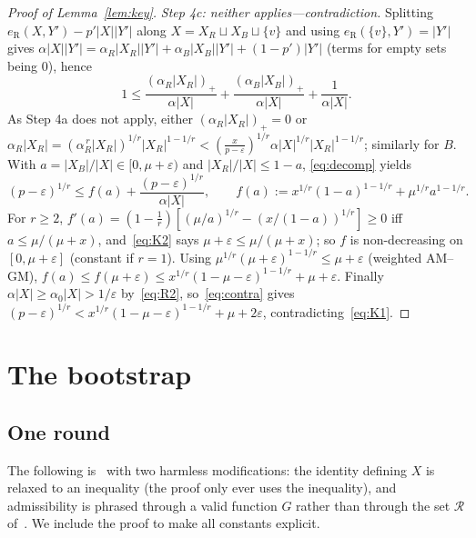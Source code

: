 \documentclass[11pt]{article}
\theoremstyle{definition}
\newcommand{\eR}{e_{\mathrm R}}
\newcommand{\eps}{\varepsilon}
\begin{document}
\begin{proof}[Proof of Lemma~\ref{lem:key}]
\smallskip\noindent\emph{Step 4c: neither applies---contradiction.}  Splitting $\eR(X,Y')-p'|X||Y'|$ along $X=X_R\sqcup X_B\sqcup\{v\}$ and using $\eR(\{v\},Y')=|Y'|$ gives $\alpha|X||Y'|=\alpha_R|X_R||Y'|+\alpha_B|X_B||Y'|+(1-p')|Y'|$ (terms for empty sets being $0$), hence
\begin{equation}\label{eq:decomp}
1\le\frac{(\alpha_R|X_R|)_+}{\alpha|X|}+\frac{(\alpha_B|X_B|)_+}{\alpha|X|}+\frac1{\alpha|X|}.
\end{equation}
As Step 4a does not apply, either $(\alpha_R|X_R|)_+=0$ or $\alpha_R|X_R|=(\alpha_R^{\,r}|X_R|)^{1/r}|X_R|^{1-1/r}<(\frac x{p-\eps})^{1/r}\alpha|X|^{1/r}|X_R|^{1-1/r}$; similarly for $B$.  With $a=|X_B|/|X|\in[0,\mu+\eps)$ and $|X_R|/|X|\le1-a$, \eqref{eq:decomp} yields
\begin{equation}\label{eq:contra}
(p-\eps)^{1/r}\le f(a)+\frac{(p-\eps)^{1/r}}{\alpha|X|},\qquad f(a):=x^{1/r}(1-a)^{1-1/r}+\mu^{1/r}a^{1-1/r}.
\end{equation}
For $r\ge2$, $f'(a)=(1-\frac1r)[(\mu/a)^{1/r}-(x/(1-a))^{1/r}]\ge0$ iff $a\le\mu/(\mu+x)$, and~\eqref{eq:K2} says $\mu+\eps\le\mu/(\mu+x)$; so $f$ is non-decreasing on $[0,\mu+\eps]$ (constant if $r=1$).  Using $\mu^{1/r}(\mu+\eps)^{1-1/r}\le\mu+\eps$ (weighted AM--GM),
$f(a)\le f(\mu+\eps)\le x^{1/r}(1-\mu-\eps)^{1-1/r}+\mu+\eps$.  Finally $\alpha|X|\ge\alpha_0|X|>1/\eps$ by~\eqref{eq:R2}, so~\eqref{eq:contra} gives $(p-\eps)^{1/r}<x^{1/r}(1-\mu-\eps)^{1-1/r}+\mu+2\eps$, contradicting~\eqref{eq:K1}.
\end{proof}

\section{The bootstrap}\label{sec:boot}

\subsection{One round}

The following is~\cite[Theorem~14]{GNNW} with two harmless modifications: the identity defining $X$ is relaxed to an inequality (the proof only ever uses the inequality), and admissibility is phrased through a valid function $G$ rather than through the set $\mathcal R$ of~\cite{GNNW}.  We include the proof to make all constants explicit.
\end{document}
